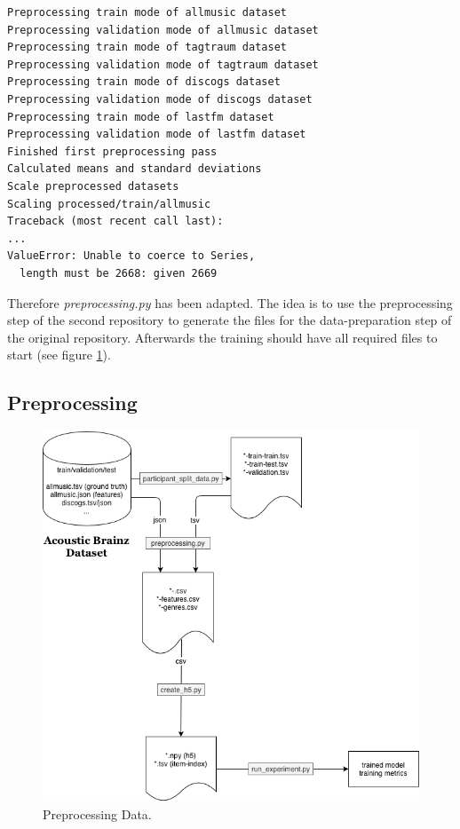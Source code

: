 \documentclass[sigconf,nonacm]{acmart}
\begin{document}
\begin{lstlisting}
Preprocessing train mode of allmusic dataset
Preprocessing validation mode of allmusic dataset
Preprocessing train mode of tagtraum dataset
Preprocessing validation mode of tagtraum dataset
Preprocessing train mode of discogs dataset
Preprocessing validation mode of discogs dataset
Preprocessing train mode of lastfm dataset
Preprocessing validation mode of lastfm dataset
Finished first preprocessing pass
Calculated means and standard deviations
Scale preprocessed datasets
Scaling processed/train/allmusic
Traceback (most recent call last):
...
ValueError: Unable to coerce to Series, 
  length must be 2668: given 2669
\end{lstlisting}

Therefore \textit{preprocessing.py} has been adapted. The idea is to use the preprocessing step of the second repository to generate the files for the data-preparation step of the original repository. Afterwards the training should have all required files to start (see figure \ref{fig:preprocess}).

\subsection{Preprocessing}
  \begin{figure}
    \includegraphics[width=\linewidth]{Preprocess-Data.png}
    \caption{Preprocessing Data.}
    \label{fig:preprocess}
  \end{figure}
\end{document}
